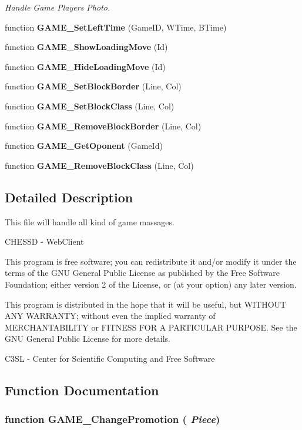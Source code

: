 \begin{CompactItemize}
\begin{CompactList}\small\item\em Handle Game Players Photo. \item\end{CompactList}\item 
function {\bf GAME\_\-SetLeftTime} (GameID, WTime, BTime)
\item 
function {\bf GAME\_\-ShowLoadingMove} (Id)
\item 
function {\bf GAME\_\-HideLoadingMove} (Id)
\item 
function {\bf GAME\_\-SetBlockBorder} (Line, Col)
\item 
function {\bf GAME\_\-SetBlockClass} (Line, Col)
\item 
function {\bf GAME\_\-RemoveBlockBorder} (Line, Col)
\item 
function {\bf GAME\_\-GetOponent} (GameId)
\item 
function {\bf GAME\_\-RemoveBlockClass} (Line, Col)
\end{CompactItemize}


\subsection{Detailed Description}
This file will handle all kind of game massages. 

CHESSD - WebClient

This program is free software; you can redistribute it and/or modify it under the terms of the GNU General Public License as published by the Free Software Foundation; either version 2 of the License, or (at your option) any later version.

This program is distributed in the hope that it will be useful, but WITHOUT ANY WARRANTY; without even the implied warranty of MERCHANTABILITY or FITNESS FOR A PARTICULAR PURPOSE. See the GNU General Public License for more details.

C3SL - Center for Scientific Computing and Free Software 

\subsection{Function Documentation}
\subsubsection[GAME\_\-ChangePromotion]{\setlength{\rightskip}{0pt plus 5cm}function GAME\_\-ChangePromotion ( {\em Piece})}\label{game_2game_8js_eeef8e48cf12de7712a24dc77aaaddaa}


